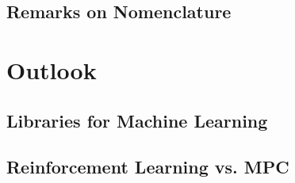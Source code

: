     \section{Remarks on Nomenclature} %

\chapter{Outlook} %

    \section{Libraries for Machine Learning} %

    \section{Reinforcement Learning vs. MPC} %
